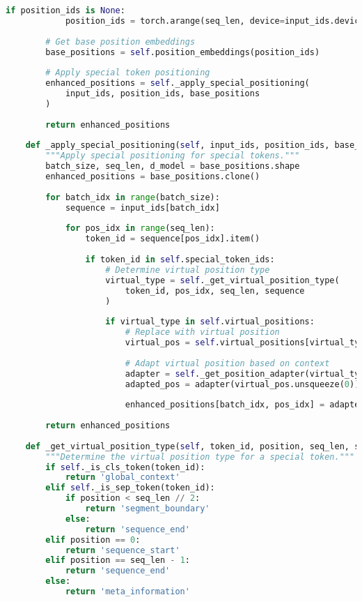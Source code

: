 \begin{lstlisting}[language=Python, caption=Learned position embeddings with special token support]
        if position_ids is None:
            position_ids = torch.arange(seq_len, device=input_ids.device).expand(batch_size, -1)
            
        # Get base position embeddings
        base_positions = self.position_embeddings(position_ids)
        
        # Apply special token positioning
        enhanced_positions = self._apply_special_positioning(
            input_ids, position_ids, base_positions
        )
        
        return enhanced_positions
        
    def _apply_special_positioning(self, input_ids, position_ids, base_positions):
        """Apply special positioning for special tokens."""
        batch_size, seq_len, d_model = base_positions.shape
        enhanced_positions = base_positions.clone()
        
        for batch_idx in range(batch_size):
            sequence = input_ids[batch_idx]
            
            for pos_idx in range(seq_len):
                token_id = sequence[pos_idx].item()
                
                if token_id in self.special_token_ids:
                    # Determine virtual position type
                    virtual_type = self._get_virtual_position_type(
                        token_id, pos_idx, seq_len, sequence
                    )
                    
                    if virtual_type in self.virtual_positions:
                        # Replace with virtual position
                        virtual_pos = self.virtual_positions[virtual_type]
                        
                        # Adapt virtual position based on context
                        adapter = self._get_position_adapter(virtual_type)
                        adapted_pos = adapter(virtual_pos.unsqueeze(0)).squeeze(0)
                        
                        enhanced_positions[batch_idx, pos_idx] = adapted_pos
                        
        return enhanced_positions
        
    def _get_virtual_position_type(self, token_id, position, seq_len, sequence):
        """Determine the virtual position type for a special token."""
        if self._is_cls_token(token_id):
            return 'global_context'
        elif self._is_sep_token(token_id):
            if position < seq_len // 2:
                return 'segment_boundary'
            else:
                return 'sequence_end'
        elif position == 0:
            return 'sequence_start'
        elif position == seq_len - 1:
            return 'sequence_end'
        else:
            return 'meta_information'
            

\end{lstlisting}
